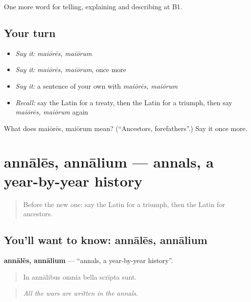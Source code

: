 \begin{grammarlens}[title={What you've built}]
One more word for telling, explaining and describing at B1.
\end{grammarlens}

\subsection*{Your turn}
\begin{itemize}
\raggedright
  \item \emph{Say it:} \emph{maiōrēs, maiōrum}
  \item \emph{Say it:} \emph{maiōrēs, maiōrum}, once more
  \item \emph{Say it:} a sentence of your own with \emph{maiōrēs, maiōrum}
  \item \emph{Recall:} say the Latin for a treaty, then the Latin for a triumph, then say \emph{maiōrēs, maiōrum} again
\end{itemize}

\begin{tcolorbox}[breakable,colback=teal!4,colframe=teal!35!black,title={Before you move on}]
What does maiōrēs, maiōrum mean? (\textquotedblleft{}Ancestors, forefathers\textquotedblright{}.) Say it once more.
\end{tcolorbox}
\section[annālēs, annālium]{annālēs, annālium — annals, a year-by-year history}

\label{lesson:LA-C344-annales}



\begin{quote}
Before the new one: say the Latin for a triumph, then the Latin for ancestors.
\end{quote}

\subsection*{You'll want to know: annālēs, annālium}
\textbf{annālēs, annālium} — \textquotedblleft{}annals, a year-by-year history\textquotedblright{}.

\begin{quote}
In annālibus omnia bella scrīpta sunt.
\end{quote}

\begin{quote}
\emph{All the wars are written in the annals.}
\end{quote}

